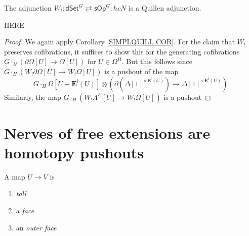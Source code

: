 \documentclass[a4paper,10pt
,draft
]{article}%
\renewcommand{\1}{\eta}%
\begin{document}
\begin{proposition}
	The adjunction 
$W_! \colon \mathsf{dSet}^G 
	\rightleftarrows 
\mathsf{sOp}^G \colon hcN$
	is a Quillen adjunction.
\end{proposition}

{\color{red} HERE}

\begin{proof}
	We again apply Corollary \ref{SIMPLQUILL COR}.
	For the claim that $W_!$ preserves cofibrations,
	it suffices to show this for the generating cofibrations
	$G\cdot_H \left( \partial \Omega[U] \to \Omega[U] \right)$ for $U \in \Omega^H$.
	But this follows since 
	$G \cdot_H \left(W_! \partial \Omega[U] \to W_! \Omega[U] \right)$
	is a pushout of the map
\[
	G \cdot_H \Omega[U - \boldsymbol{E}^{\mathsf{i}}(U)]
\otimes
	\left(
	\partial \left( \Delta[1]^{\times \boldsymbol{E}^{\mathsf{i}}(U) } \right) 
		\to
	\Delta[1]^{\times \boldsymbol{E}^{\mathsf{i}}(U) }
	\right).
\]
Similarly, the map
	$G \cdot_H \left(W_! \Lambda^E[U] \to W_! \Omega[U] \right)$
is a pushout 


	
\end{proof}




\newpage







\section{Nerves of free extensions are homotopy pushouts}

\begin{definition}
      A map $U \to V$ is
      \begin{enumerate}[label = (\roman*)]
      \item \textit{tall}
      \item a \textit{face}
      \item an \textit{outer face}
      \end{enumerate}
\end{definition}
\end{document}
